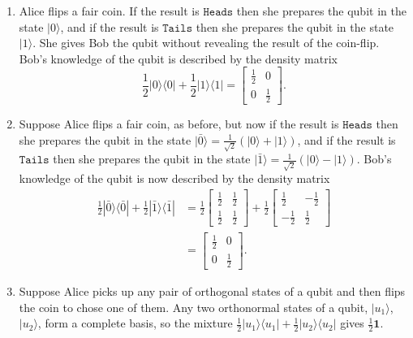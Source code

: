 \documentclass[fleqn]{article}
\begin{document}
\begin{enumerate}
\def\labelenumi{\arabic{enumi}.}
\item
  Alice flips a fair coin.
  If the result is \(\texttt{Heads}\) then she prepares the qubit in the state \(|0\rangle\), and if the result is \(\texttt{Tails}\) then she prepares the qubit in the state \(|1\rangle\).
  She gives Bob the qubit without revealing the result of the coin-flip.
  Bob's knowledge of the qubit is described by the density matrix
  \[
     \frac12|0\rangle\langle 0| + \frac12|1\rangle\langle 1|
     =
     \begin{bmatrix}
       \frac12 & 0
     \\0 & \frac12
     \end{bmatrix}.
   \]
\item
  Suppose Alice flips a fair coin, as before, but now if the result is \(\texttt{Heads}\) then she prepares the qubit in the state \(|\bar{0}\rangle = \frac{1}{\sqrt{2}}(|0\rangle + |1\rangle)\), and if the result is \(\texttt{Tails}\) then she prepares the qubit in the state \(|\bar{1}\rangle = \frac{1}{\sqrt{2}}(|0\rangle - |1\rangle)\).
  Bob's knowledge of the qubit is now described by the density matrix
  \[
     \begin{aligned}
       \frac12|\bar{0}\rangle\langle\bar{0}| + \frac12|\bar{1}\rangle\langle\bar{1}|
       &=
       \frac12
       \begin{bmatrix}
       \frac12 & \frac12
       \\\frac12 & \frac12
       \end{bmatrix}
       +
       \frac12
       \begin{bmatrix}
       \frac12 & -\frac12
       \\-\frac12 & \frac12
       \end{bmatrix}
     \\&=
       \begin{bmatrix}
       \frac12 & 0
       \\0 & \frac12
       \end{bmatrix}.
     \end{aligned}
   \]
\item
  Suppose Alice picks up any pair of orthogonal states of a qubit and then flips the coin to chose one of them.
  Any two orthonormal states of a qubit, \(|u_1\rangle\), \(|u_2\rangle\), form a complete basis, so the mixture \(\frac12|u_1\rangle\langle u_1|+\frac12|u_2\rangle\langle u_2|\) gives \(\frac12\mathbf{1}\).
\end{enumerate}
\end{document}
